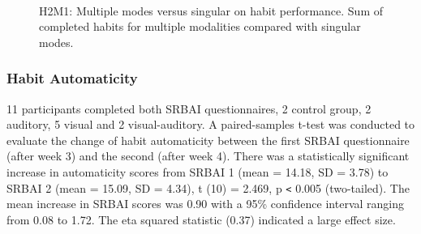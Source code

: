 \begin{figure}[H]
\centering

  \caption{H2M1: Multiple modes versus singular on habit performance. Sum of completed habits for multiple modalities compared with singular modes.}~\label{fig:m1_h2}
\end{figure}


\subsubsection*{Habit Automaticity}
11 participants completed both SRBAI questionnaires, 2 control group, 2 auditory, 5 visual and 2 visual-auditory. A paired-samples t-test was conducted to evaluate the change of habit automaticity between the first SRBAI questionnaire (after week 3) and the second (after week 4). There was a statistically significant increase in automaticity scores from SRBAI 1 (mean = 14.18, SD = 3.78) to SRBAI 2 (mean = 15.09, SD = 4.34), t (10) = 2.469, p \verb|<| 0.005 (two-tailed). The mean increase in SRBAI scores was 0.90 with a 95\% confidence interval ranging from 0.08 to 1.72. The eta squared statistic (0.37) indicated a large effect size.



